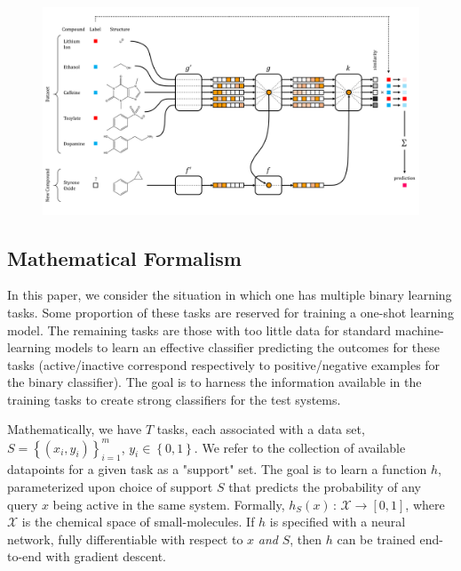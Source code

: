 \documentclass[journal=jacsat,manuscript=article]{achemso}
\begin{document}
\begin{figure}[h]
\includegraphics[width=\textwidth]{schematic.png}
\label{fig:schematic}
\end{figure}

\subsection{Mathematical Formalism}

In this paper, we consider the situation in which one has multiple binary learning tasks. Some proportion of these tasks are reserved for training a one-shot learning model. The remaining tasks are those with too little data for standard machine-learning models to learn an effective classifier predicting the outcomes for these tasks (active/inactive correspond respectively to positive/negative examples for the binary classifier). The goal is to harness the information available in the training tasks to create strong classifiers for the test systems. 


Mathematically, we have $T$ tasks, each associated with a data set, $S=\left\{\left(x_i,y_i\right)\right\}_{i=1}^{m}$, $y_i\in\left\{0,1\right\}$. We refer to the collection of available datapoints for a given task as a "support" set. The goal is to learn a function $h$, parameterized upon choice of support $S$ that predicts the probability of any query $x$ being active in the same system. Formally, $h_S(x)\,:\,\mathcal{X}\rightarrow\left[0,1\right]$, where $\mathcal{X}$ is the chemical space of small-molecules. If $h$ is specified with a neural network, fully differentiable with respect to $x$ \emph{and} $S$, then $h$ can be trained end-to-end with gradient descent.
\end{document}
